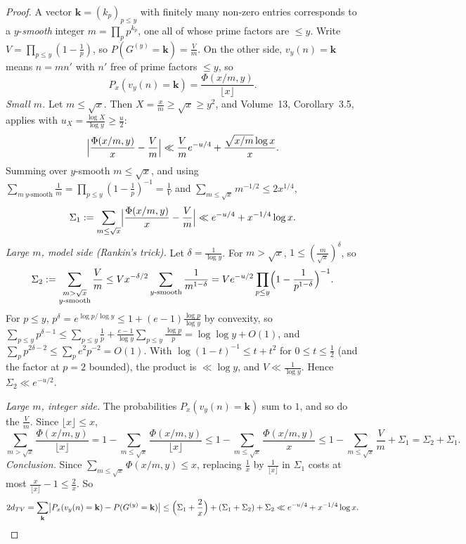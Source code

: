 \begin{proof}
A vector $\mathbf k=(k_p)_{p\le y}$ with finitely many non-zero entries corresponds to a $y$-\emph{smooth} integer $m=\prod_pp^{k_p}$, one all of whose prime factors are $\le y$. Write $V=\prod_{p\le y}(1-\frac1p)$, so $P(G^{(y)}=\mathbf k)=\frac Vm$. On the other side, $v_y(n)=\mathbf k$ means $n=mn'$ with $n'$ free of prime factors $\le y$, so
\[
P_x(v_y(n)=\mathbf k)=\frac{\Phi(x/m,y)}{\lfloor x\rfloor}.
\]
\emph{Small $m$.} Let $m\le\sqrt x$. Then $X=\frac xm\ge\sqrt x\ge y^2$, and Volume~13, Corollary~3.5, applies with $u_X=\frac{\log X}{\log y}\ge\frac u2$:
\[
\Bigl|\frac{\Phi(x/m,y)}x-\frac Vm\Bigr|\ll\frac Vme^{-u/4}+\frac{\sqrt{x/m}\log x}x.
\]
Summing over $y$-smooth $m\le\sqrt x$, and using $\sum_{m\ y\text{-smooth}}\frac1m=\prod_{p\le y}(1-\frac1p)^{-1}=\frac1V$ and $\sum_{m\le\sqrt x}m^{-1/2}\le2x^{1/4}$,
\[
\Sigma_1:=\sum_{m\le\sqrt x}\Bigl|\frac{\Phi(x/m,y)}x-\frac Vm\Bigr|\ll e^{-u/4}+x^{-1/4}\log x.
\]
\emph{Large $m$, model side (Rankin's trick).} Let $\delta=\frac1{\log y}$. For $m>\sqrt x$, $1\le(\frac m{\sqrt x})^\delta$, so
\[
\Sigma_2:=\sum_{\substack{m>\sqrt x\\y\text{-smooth}}}\frac Vm\le Vx^{-\delta/2}\sum_{y\text{-smooth}}\frac1{m^{1-\delta}}=Ve^{-u/2}\prod_{p\le y}\Bigl(1-\frac1{p^{1-\delta}}\Bigr)^{-1}.
\]
For $p\le y$, $p^\delta=e^{\log p/\log y}\le1+(e-1)\frac{\log p}{\log y}$ by convexity, so $\sum_{p\le y}p^{\delta-1}\le\sum_{p\le y}\frac1p+\frac{e-1}{\log y}\sum_{p\le y}\frac{\log p}p=\log\log y+O(1)$, and $\sum_pp^{2\delta-2}\le\sum_pe^2p^{-2}=O(1)$. With $\log(1-t)^{-1}\le t+t^2$ for $0\le t\le\frac12$ (and the factor at $p=2$ bounded), the product is $\ll\log y$, and $V\ll\frac1{\log y}$. Hence $\Sigma_2\ll e^{-u/2}$.

\emph{Large $m$, integer side.} The probabilities $P_x(v_y(n)=\mathbf k)$ sum to $1$, and so do the $\frac Vm$. Since $\lfloor x\rfloor\le x$,
\[
\sum_{m>\sqrt x}\frac{\Phi(x/m,y)}{\lfloor x\rfloor}=1-\sum_{m\le\sqrt x}\frac{\Phi(x/m,y)}{\lfloor x\rfloor}\le1-\sum_{m\le\sqrt x}\frac{\Phi(x/m,y)}x\le1-\sum_{m\le\sqrt x}\frac Vm+\Sigma_1=\Sigma_2+\Sigma_1.
\]
\emph{Conclusion.} Since $\sum_{m\le\sqrt x}\Phi(x/m,y)\le x$, replacing $\frac1x$ by $\frac1{\lfloor x\rfloor}$ in $\Sigma_1$ costs at most $\frac x{\lfloor x\rfloor}-1\le\frac2x$. So
\[
2d_{TV}=\sum_{\mathbf k}\bigl|P_x(v_y(n)=\mathbf k)-P(G^{(y)}=\mathbf k)\bigr|\le\Bigl(\Sigma_1+\frac2x\Bigr)+(\Sigma_1+\Sigma_2)+\Sigma_2\ll e^{-u/4}+x^{-1/4}\log x.
\]
\end{proof}

